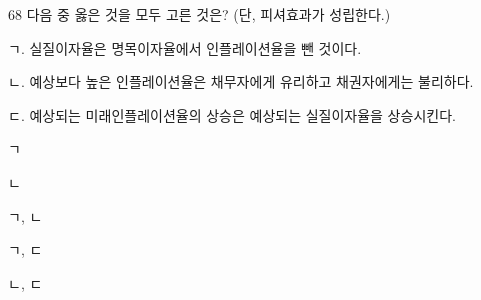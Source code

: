 \begin{question}{68}
다음 중 옳은 것을 모두 고른 것은? (단, 피셔효과가 성립한다.)
\begin{framedtext}
ㄱ. 실질이자율은 명목이자율에서 인플레이션율을 뺀 것이다. \par
ㄴ. 예상보다 높은 인플레이션율은 채무자에게 유리하고 채권자에게는 불리하다. \par
ㄷ. 예상되는 미래인플레이션율의 상승은 예상되는 실질이자율을 상승시킨다. \par
\end{framedtext}
\begin{choices}
  \item ㄱ
  \item ㄴ
  \item ㄱ, ㄴ
  \item ㄱ, ㄷ
  \item ㄴ, ㄷ
\end{choices}
\end{question}
